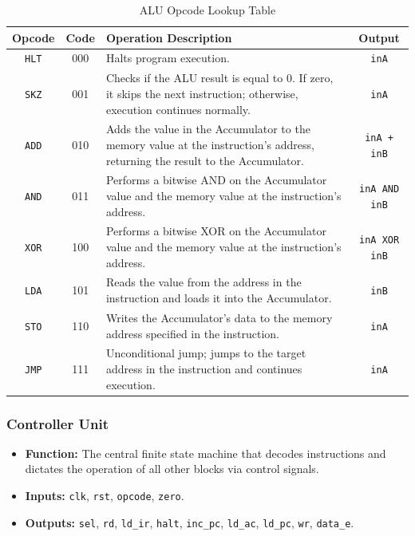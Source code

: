 \begin{table}[H]
	\centering
	\caption{ALU Opcode Lookup Table}
	\renewcommand{\arraystretch}{1.3}
	\begin{tabular}{|c|c|p{8.5cm}|c|}
		\hline
		\textbf{Opcode} & \textbf{Code} & \textbf{Operation Description}                                                                                               & \textbf{Output}      \\ \hline
		\texttt{HLT}    & 000           & Halts program execution.                                                                                                     & \texttt{inA}         \\ \hline
		\texttt{SKZ}    & 001           & Checks if the ALU result is equal to 0. If zero, it skips the next instruction; otherwise, execution continues normally.     & \texttt{inA}         \\ \hline
		\texttt{ADD}    & 010           & Adds the value in the Accumulator to the memory value at the instruction's address, returning the result to the Accumulator. & \texttt{inA + inB}   \\ \hline
		\texttt{AND}    & 011           & Performs a bitwise AND on the Accumulator value and the memory value at the instruction's address.                           & \texttt{inA AND inB} \\ \hline
		\texttt{XOR}    & 100           & Performs a bitwise XOR on the Accumulator value and the memory value at the instruction's address.                           & \texttt{inA XOR inB} \\ \hline
		\texttt{LDA}    & 101           & Reads the value from the address in the instruction and loads it into the Accumulator.                                       & \texttt{inB}         \\ \hline
		\texttt{STO}    & 110           & Writes the Accumulator's data to the memory address specified in the instruction.                                            & \texttt{inA}         \\ \hline
		\texttt{JMP}    & 111           & Unconditional jump; jumps to the target address in the instruction and continues execution.                                  & \texttt{inA}         \\ \hline
	\end{tabular}
\end{table}

\subsubsection*{Controller Unit}
\begin{itemize}
	\item \textbf{Function:} The central finite state machine that decodes instructions and dictates the operation of all other blocks via control signals.
	\item \textbf{Inputs:} \texttt{clk}, \texttt{rst}, \texttt{opcode}, \texttt{zero}.
	\item \textbf{Outputs:} \texttt{sel}, \texttt{rd}, \texttt{ld\_ir}, \texttt{halt}, \texttt{inc\_pc}, \texttt{ld\_ac}, \texttt{ld\_pc}, \texttt{wr}, \texttt{data\_e}.
\end{itemize}

